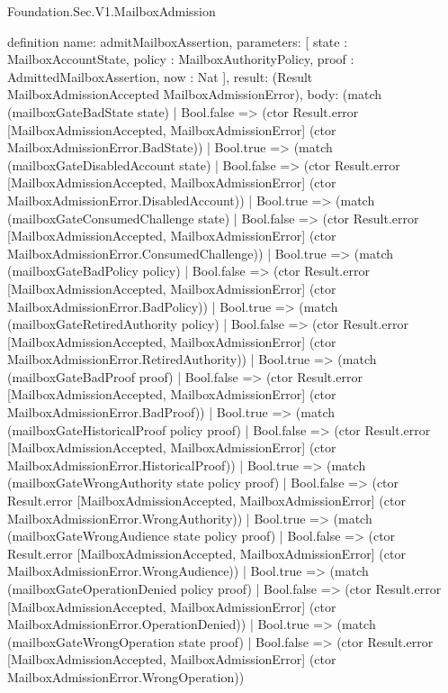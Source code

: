 \begin{lexlean}{Foundation.Sec.V1.MailboxAdmission}
\begin{semanticmodule}
definition{
  name: admitMailboxAssertion,
  parameters: [
    state : MailboxAccountState,
    policy : MailboxAuthorityPolicy,
    proof : AdmittedMailboxAssertion,
    now : Nat
  ],
  result: (Result MailboxAdmissionAccepted MailboxAdmissionError),
  body: (match (mailboxGateBadState state)
    | Bool.false => (ctor Result.error [MailboxAdmissionAccepted, MailboxAdmissionError] (ctor MailboxAdmissionError.BadState))
    | Bool.true => (match (mailboxGateDisabledAccount state)
      | Bool.false => (ctor Result.error [MailboxAdmissionAccepted, MailboxAdmissionError] (ctor MailboxAdmissionError.DisabledAccount))
      | Bool.true => (match (mailboxGateConsumedChallenge state)
        | Bool.false => (ctor Result.error [MailboxAdmissionAccepted, MailboxAdmissionError] (ctor MailboxAdmissionError.ConsumedChallenge))
        | Bool.true => (match (mailboxGateBadPolicy policy)
          | Bool.false => (ctor Result.error [MailboxAdmissionAccepted, MailboxAdmissionError] (ctor MailboxAdmissionError.BadPolicy))
          | Bool.true => (match (mailboxGateRetiredAuthority policy)
            | Bool.false => (ctor Result.error [MailboxAdmissionAccepted, MailboxAdmissionError] (ctor MailboxAdmissionError.RetiredAuthority))
            | Bool.true => (match (mailboxGateBadProof proof)
              | Bool.false => (ctor Result.error [MailboxAdmissionAccepted, MailboxAdmissionError] (ctor MailboxAdmissionError.BadProof))
              | Bool.true => (match (mailboxGateHistoricalProof policy proof)
                | Bool.false => (ctor Result.error [MailboxAdmissionAccepted, MailboxAdmissionError] (ctor MailboxAdmissionError.HistoricalProof))
                | Bool.true => (match (mailboxGateWrongAuthority state policy proof)
                  | Bool.false => (ctor Result.error [MailboxAdmissionAccepted, MailboxAdmissionError] (ctor MailboxAdmissionError.WrongAuthority))
                  | Bool.true => (match (mailboxGateWrongAudience state policy proof)
                    | Bool.false => (ctor Result.error [MailboxAdmissionAccepted, MailboxAdmissionError] (ctor MailboxAdmissionError.WrongAudience))
                    | Bool.true => (match (mailboxGateOperationDenied policy proof)
                      | Bool.false => (ctor Result.error [MailboxAdmissionAccepted, MailboxAdmissionError] (ctor MailboxAdmissionError.OperationDenied))
                      | Bool.true => (match (mailboxGateWrongOperation state proof)
                        | Bool.false => (ctor Result.error [MailboxAdmissionAccepted, MailboxAdmissionError] (ctor MailboxAdmissionError.WrongOperation))
}
\end{semanticmodule}
\end{lexlean}

